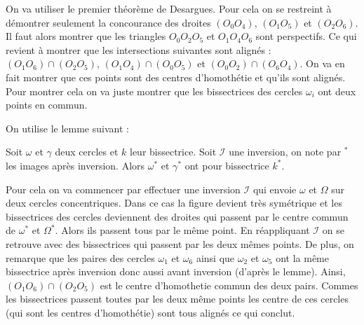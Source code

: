 \begin{sol}
On va utiliser le premier théorème de Desargues. Pour cela on se restreint à démontrer seulement la concourance des droites $(O_0O_4)$, $(O_1O_5)$ et $(O_2O_6)$. Il faut alors montrer que les triangles $O_0O_2O_5$ et $O_1O_4O_6$ sont perspectifs. Ce qui revient à montrer que les intersections suivantes sont alignés : $(O_1O_6)\cap(O_2O_5)$, $(O_1O_4)\cap (O_0O_5)$ et $(O_0O_2)\cap (O_6O_4)$. On va en fait montrer que ces points sont des centres d'homothétie et qu'ils sont alignés. Pour montrer cela on va juste montrer que les bissectrices des cercles $\omega_i$ ont deux points en commun.

On utilise le lemme suivant :

\begin{lem}
Soit $\omega$ et $\gamma$ deux cercles et $k$ leur bissectrice. Soit $\mathcal I$ une inversion, on note par $^*$ les images après inversion. Alors $\omega^*$ et $\gamma^*$ ont pour bissectrice $k^*$.
\end{lem}

Pour cela on va commencer par effectuer une inversion $\mathcal I$ qui envoie $\omega$ et $\Omega$ sur deux cercles concentriques. Dans ce cas la figure devient très symétrique et les bissectrices des cercles deviennent des droites qui passent par le centre commun de $\omega^*$ et $\Omega^*$. Alors ils passent tous par le même point. En réappliquant $\mathcal I$ on se retrouve avec des bissectrices qui passent par les deux mêmes points. De plus, on remarque que les paires des cercles $\omega_1$ et $\omega_6$ ainsi que $\omega_2$ et $\omega_5$ ont la même bissectrice après inversion donc aussi avant inversion (d'après le lemme). Ainsi, $(O_1O_6)\cap(O_2O_5)$ est le centre d'homothetie commun des deux pairs. Commes les bissectrices passent toutes par les deux même points les centre de ces cercles (qui sont les centres d'homothétie) sont tous alignés ce qui conclut.
\end{sol}

